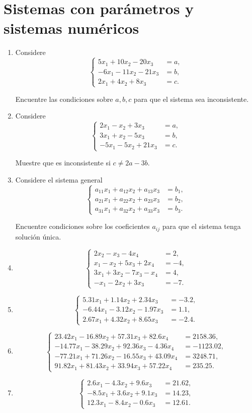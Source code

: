\documentclass[12pt]{article}
\theoremstyle{remark}
\newcommand{\sistema}[1]{%
\[
\left\{
\begin{aligned}
#1
\end{aligned}
\right.
\]
}
\begin{document}
\section{Sistemas con parámetros y sistemas numéricos}

\begin{enumerate}[label=\textbf{\arabic*.},start=55,leftmargin=*]

\item Considere
\sistema{
5x_1+10x_2-20x_3&=a,\\
-6x_1-11x_2-21x_3&=b,\\
2x_1+4x_2+8x_3&=c.
}
Encuentre las condiciones sobre $a,b,c$ para que el sistema sea inconsistente.

\item Considere
\sistema{
2x_1-x_2+3x_3&=a,\\
3x_1+x_2-5x_3&=b,\\
-5x_1-5x_2+21x_3&=c.
}
Muestre que es inconsistente si $c\neq 2a-3b$.

\item Considere el sistema general
\sistema{
a_{11}x_1+a_{12}x_2+a_{13}x_3&=b_1,\\
a_{21}x_1+a_{22}x_2+a_{23}x_3&=b_2,\\
a_{31}x_1+a_{32}x_2+a_{33}x_3&=b_3.
}
Encuentre condiciones sobre los coeficientes $a_{ij}$ para que el sistema tenga solución única.

\item \sistema{
2x_2-x_3-4x_4&=2,\\
x_1-x_2+5x_3+2x_4&=-4,\\
3x_1+3x_2-7x_3-x_4&=4,\\
-x_1-2x_2+3x_3&=-7.
}

\item \sistema{
5.31x_1+1.14x_2+2.34x_3&=-3.2,\\
-6.44x_1-3.12x_2-1.97x_3&=1.1,\\
2.67x_1+4.32x_2+8.65x_3&=-2.4.
}

\item \sistema{
23.42x_1-16.89x_2+57.31x_3+82.6x_4&=2158.36,\\
-14.77x_1-38.29x_2+92.36x_3-4.36x_4&=-1123.02,\\
-77.21x_1+71.26x_2-16.55x_3+43.09x_4&=3248.71,\\
91.82x_1+81.43x_2+33.94x_3+57.22x_4&=235.25.
}

\item \sistema{
2.6x_1-4.3x_2+9.6x_3&=21.62,\\
-8.5x_1+3.6x_2+9.1x_3&=14.23,\\
12.3x_1-8.4x_2-0.6x_3&=12.61.
}


\end{enumerate}
\end{document}
